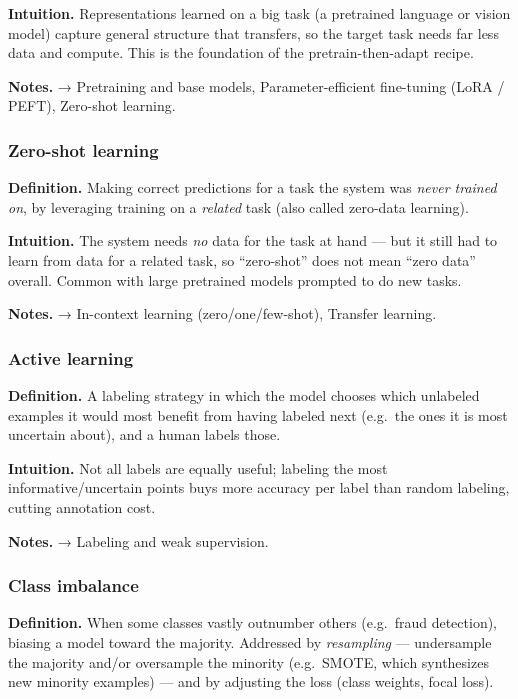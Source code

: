 \documentclass[
  10pt,
  letterpaper,
  onecolumn]{article}
\begin{document}
\textbf{Intuition.} Representations learned on a big task (a pretrained
language or vision model) capture general structure that transfers, so
the target task needs far less data and compute. This is the foundation
of the pretrain-then-adapt recipe.

\textbf{Notes.} → Pretraining and base models, Parameter-efficient
fine-tuning (LoRA / PEFT), Zero-shot learning.

\hypertarget{zero-shot-learning}{%
\subsubsection{Zero-shot learning}\label{zero-shot-learning}}

\textbf{Definition.} Making correct predictions for a task the system
was \emph{never trained on}, by leveraging training on a \emph{related}
task (also called zero-data learning).

\textbf{Intuition.} The system needs \emph{no} data for the task at hand
--- but it still had to learn from data for a related task, so
``zero-shot'' does not mean ``zero data'' overall. Common with large
pretrained models prompted to do new tasks.

\textbf{Notes.} → In-context learning (zero/one/few-shot), Transfer
learning.

\hypertarget{active-learning}{%
\subsubsection{Active learning}\label{active-learning}}

\textbf{Definition.} A labeling strategy in which the model chooses
which unlabeled examples it would most benefit from having labeled next
(e.g.~the ones it is most uncertain about), and a human labels those.

\textbf{Intuition.} Not all labels are equally useful; labeling the most
informative/uncertain points buys more accuracy per label than random
labeling, cutting annotation cost.

\textbf{Notes.} → Labeling and weak supervision.

\hypertarget{class-imbalance}{%
\subsubsection{Class imbalance}\label{class-imbalance}}

\textbf{Definition.} When some classes vastly outnumber others
(e.g.~fraud detection), biasing a model toward the majority. Addressed
by \emph{resampling} --- undersample the majority and/or oversample the
minority (e.g.~SMOTE, which synthesizes new minority examples) --- and
by adjusting the loss (class weights, focal loss).
\end{document}
